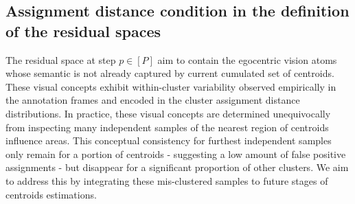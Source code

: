 

    \subsection{Assignment distance condition in the definition of the residual spaces}
    \label{apd:chapter_5_distance_distribution_thresholding}

        The residual space at step $p\in [P]$ aim to contain the egocentric vision atoms whose semantic is not already captured by current cumulated set of centroids. These visual concepts exhibit within-cluster variability observed empirically in the annotation frames and encoded in the cluster assignment distance distributions.
        In practice, these visual concepts are determined unequivocally from inspecting many independent samples of the nearest region of centroids influence areas. This conceptual consistency for furthest independent samples only remain for a portion of centroids - suggesting a low amount of false positive assignments - but disappear for a significant proportion of other clusters. We aim to address this by integrating these mis-clustered samples to future stages of centroids estimations. 

